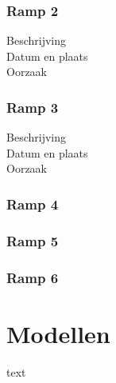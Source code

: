 \documentclass{article}
\begin{document}
			\subsubsection{Ramp 2}
			\begin{description}
			\item[Beschrijving]
			\item[Datum en plaats] 
			\item[Oorzaak]
			\end{description}
			
			\subsubsection{Ramp 3}
			\begin{description}
			\item[Beschrijving]
			\item[Datum en plaats] 
			\item[Oorzaak]
			\end{description}
			
			\subsubsection{Ramp 4}
			\subsubsection{Ramp 5}
			\subsubsection{Ramp 6}
		
	\newpage
	
	
	\section{Modellen}
	
	text
	
\end{document}
